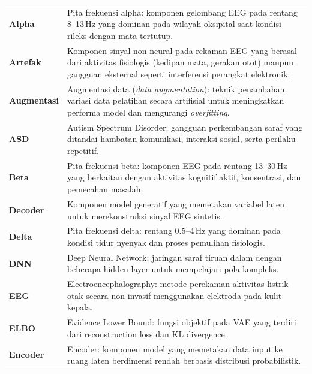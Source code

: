 
\begin{longtable}{p{3cm} p{11cm}}

\textbf{Alpha} & Pita frekuensi alpha: komponen gelombang EEG pada rentang 8--13\,Hz yang dominan pada wilayah oksipital saat kondisi rileks dengan mata tertutup. \\

\textbf{Artefak} & Komponen sinyal non-neural pada rekaman EEG yang berasal dari aktivitas fisiologis (kedipan mata, gerakan otot) maupun gangguan eksternal seperti interferensi perangkat elektronik. \\

\textbf{Augmentasi} & Augmentasi data (\textit{data augmentation}): teknik penambahan variasi data pelatihan secara artifisial untuk meningkatkan performa model dan mengurangi \textit{overfitting}. \\

\textbf{ASD} & Autism Spectrum Disorder: gangguan perkembangan saraf yang ditandai hambatan komunikasi, interaksi sosial, serta perilaku repetitif. \\

\textbf{Beta} & Pita frekuensi beta: komponen EEG pada rentang 13--30\,Hz yang berkaitan dengan aktivitas kognitif aktif, konsentrasi, dan pemecahan masalah. \\

\textbf{Decoder} & Komponen model generatif yang memetakan variabel laten untuk merekonstruksi sinyal EEG sintetis. \\

\textbf{Delta} & Pita frekuensi delta: rentang 0.5--4\,Hz yang dominan pada kondisi tidur nyenyak dan proses pemulihan fisiologis. \\

\textbf{DNN} & Deep Neural Network: jaringan saraf tiruan dalam dengan beberapa hidden layer untuk mempelajari pola kompleks. \\

\textbf{EEG} & Electroencephalography: metode perekaman aktivitas listrik otak secara non-invasif menggunakan elektroda pada kulit kepala. \\

\textbf{ELBO} & Evidence Lower Bound: fungsi objektif pada VAE yang terdiri dari reconstruction loss dan KL divergence. \\

\textbf{Encoder} & Encoder: komponen model yang memetakan data input ke ruang laten berdimensi rendah berbasis distribusi probabilistik. \\


\end{longtable}
